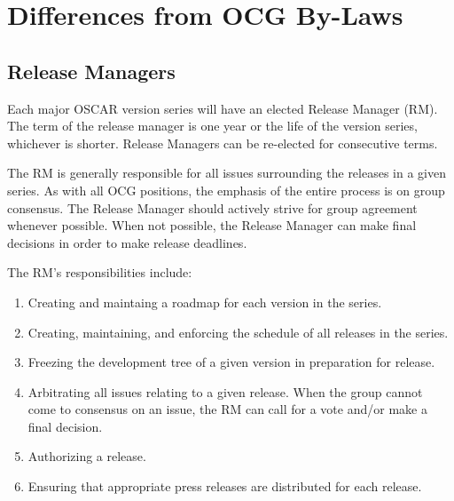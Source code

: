 %
%
%

\section{Differences from OCG By-Laws}

\subsection{Release Managers}

Each major OSCAR version series will have an elected Release Manager
(RM).  The term of the release manager is one year or the life of the
version series, whichever is shorter.  Release Managers can be
re-elected for consecutive terms.

The RM is generally responsible for all issues surrounding the
releases in a given series.  As with all OCG positions, the emphasis
of the entire process is on group consensus.  The Release Manager
should actively strive for group agreement whenever possible.  When
not possible, the Release Manager can make final decisions in order to
make release deadlines.

The RM's responsibilities include:

\begin{enumerate}
\item Creating and maintaing a roadmap for each version in the series.
  
\item Creating, maintaining, and enforcing the schedule of all
  releases in the series.

\item Freezing the development tree of a given version in preparation
  for release.

\item Arbitrating all issues relating to a given release.  When the
  group cannot come to consensus on an issue, the RM can call for a
  vote and/or make a final decision.

\item Authorizing a release.
  
\item Ensuring that appropriate press releases are distributed for
  each release.
\end{enumerate}


